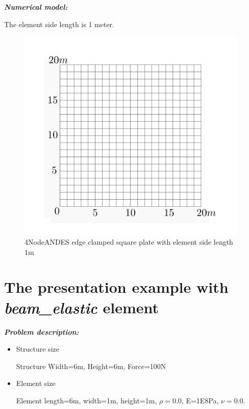 \documentclass[fleqn,11pt,letter]{article}
\begin{document}
\newpage
\noindent \emph{\textbf{Numerical model:}}

The element side length is 1 meter. 


\begin{figure}[H]
  \centering
  \includegraphics[width=11cm]{../Figure_files/4NodeANDES/square_plate4.png}
  \caption{4NodeANDES edge clamped square plate with element side length 1m }
  \label{fig 4NodeANDES edges clamped square plate with element side length 1m }
\end{figure}







\newpage
\section{The presentation example with \emph{beam\_elastic} element}



\emph{\textbf{Problem description:}}

\begin{itemize}
  \item Structure size

    Structure Width=6m, Height=6m, Force=100N 

  \item Element size

    Element length=6m, width=1m, height=1m, $\rho=0.0$, E=1E8Pa, $\nu=0.0$.
\end{itemize}
\end{document}
